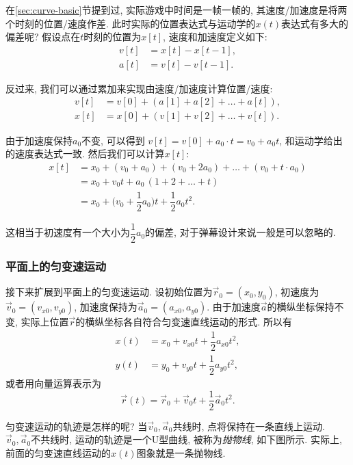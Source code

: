 在\ref{sec:curve-basic}节提到过,
实际游戏中时间是一帧一帧的,
其速度/加速度是将两个时刻的位置/速度作差.
此时实际的位置表达式与运动学的$x(t)$表达式有多大的偏差呢?
假设点在$t$时刻的位置为$x[t]$, 速度和加速度定义如下:
\begin{align*}
  v[t] & = x[t] - x[t-1], \\
  a[t] & = v[t] - v[t-1].
\end{align*}

反过来, 我们可以通过累加来实现由速度/加速度计算位置/速度:
\begin{align*}
  v[t] & = v[0] + (a[1] + a[2] + \dots + a[t]), \\
  x[t] & = x[0] + (v[1] + v[2] + \dots + v[t]).
\end{align*}

由于加速度保持$a_0$不变, 可以得到
$v[t] = v[0] + a_0\cdot t = v_0 + a_0t$,
和运动学给出的速度表达式一致.
然后我们可以计算$x[t]$:
\begin{align*}
  x[t] & = x_0 + (v_0 + a_0) + (v_0 + 2a_0)
  + \dots + (v_0 + t\cdot a_0)                                  \\
       & = x_0 + v_0 t + a_0\,(1+2+\dots+t)                     \\
       & = x_0 + \Big(v_0+\dfrac12a_0\Big) t + \dfrac12 a_0t^2.
\end{align*}

这相当于初速度有一个大小为$\dfrac12a_0$的偏差,
对于弹幕设计来说一般是可以忽略的.

\subsubsection{平面上的匀变速运动}

接下来扩展到平面上的匀变速运动.
设初始位置为$\vec r_0 = (x_0,y_0)$,
初速度为$\vec v_0 = (v_{x0},v_{y0})$,
加速度保持为$\vec a_0 = (a_{x0},a_{y0})$.
由于加速度$\vec a$的横纵坐标保持不变,
实际上位置$\vec r$的横纵坐标各自符合匀变速直线运动的形式. 所以有
\begin{align*}
  x(t) & = x_0 + v_{x0} t + \dfrac12 a_{x0} t^2, \\
  y(t) & = y_0 + v_{y0} t + \dfrac12 a_{y0} t^2,
\end{align*}
或者用向量运算表示为
\[
  \vec r(t) = \vec r_0 + \vec v_0 t + \dfrac12 \vec a_0 t^2.
\]

匀变速运动的轨迹是怎样的呢?
当$\vec v_0,\vec a_0$共线时, 点将保持在一条直线上运动.
$\vec v_0,\vec a_0$不共线时, 运动的轨迹是一个U型曲线,
被称为\emph{抛物线}, 如下图所示.
实际上, 前面的匀变速直线运动的$x(t)$图象就是一条抛物线.

\begin{center}
\end{center}
